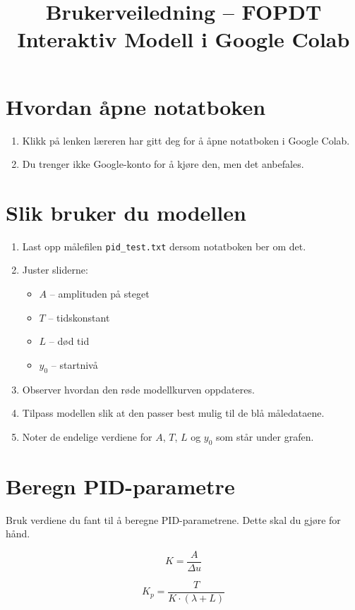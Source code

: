 \documentclass[12pt]{article}
\begin{document}
\title{Brukerveiledning -- FOPDT Interaktiv Modell i Google Colab}
\author{}
\date{}
\maketitle

\section*{Hvordan åpne notatboken}
\begin{enumerate}
    \item Klikk på lenken læreren har gitt deg for å åpne notatboken i Google Colab.
    \item Du trenger ikke Google-konto for å kjøre den, men det anbefales.
\end{enumerate}

\section*{Slik bruker du modellen}
\begin{enumerate}
    \item Last opp målefilen \texttt{pid\_test.txt} dersom notatboken ber om det.
    \item Juster sliderne:
    \begin{itemize}
        \item $A$ – amplituden på steget
        \item $T$ – tidskonstant
        \item $L$ – død tid
        \item $y_0$ – startnivå
    \end{itemize}
    \item Observer hvordan den røde modellkurven oppdateres.
    \item Tilpass modellen slik at den passer best mulig til de blå måledataene.
    \item Noter de endelige verdiene for $A$, $T$, $L$ og $y_0$ som står under grafen.
\end{enumerate}

\section*{Beregn PID-parametre}
Bruk verdiene du fant til å beregne PID-parametrene.  
Dette skal du gjøre for hånd.

\[
K = \frac{A}{\Delta u}
\]

\[
K_p = \frac{T}{K \cdot (\lambda + L)}
\]
\end{document}
